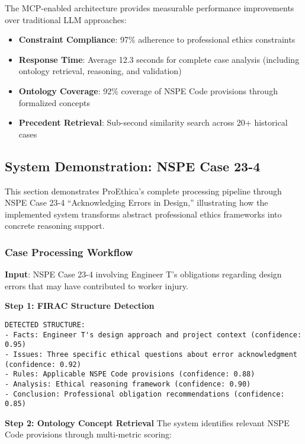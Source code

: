 The MCP-enabled architecture provides measurable performance improvements over traditional LLM approaches:

\begin{itemize}
\item \textbf{Constraint Compliance}: 97\% adherence to professional ethics constraints
\item \textbf{Response Time}: Average 12.3 seconds for complete case analysis (including ontology retrieval, reasoning, and validation)
\item \textbf{Ontology Coverage}: 92\% coverage of NSPE Code provisions through formalized concepts
\item \textbf{Precedent Retrieval}: Sub-second similarity search across 20+ historical cases
\end{itemize}

\subsection{System Demonstration: NSPE Case 23-4}

This section demonstrates ProEthica's complete processing pipeline through NSPE Case 23-4 ``Acknowledging Errors in Design,'' illustrating how the implemented system transforms abstract professional ethics frameworks into concrete reasoning support.

\subsubsection{Case Processing Workflow}

\textbf{Input}: NSPE Case 23-4 involving Engineer T's obligations regarding design errors that may have contributed to worker injury.

\textbf{Step 1: FIRAC Structure Detection}
\begin{verbatim}
DETECTED STRUCTURE:
- Facts: Engineer T's design approach and project context (confidence: 0.95)
- Issues: Three specific ethical questions about error acknowledgment (confidence: 0.92)
- Rules: Applicable NSPE Code provisions (confidence: 0.88)
- Analysis: Ethical reasoning framework (confidence: 0.90)
- Conclusion: Professional obligation recommendations (confidence: 0.85)
\end{verbatim}

\textbf{Step 2: Ontology Concept Retrieval}
The system identifies relevant NSPE Code provisions through multi-metric scoring:

